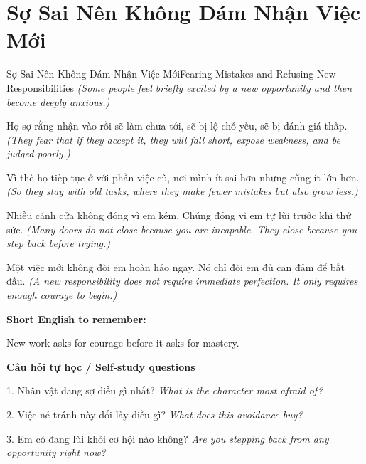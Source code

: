 \section{Sợ Sai Nên Không Dám Nhận Việc Mới}
\begin{truyen}{Sợ Sai Nên Không Dám Nhận Việc Mới}{Fearing Mistakes and Refusing New Responsibilities}
\textit{(Some people feel briefly excited by a new opportunity and then become deeply anxious.)}

Họ sợ rằng nhận vào rồi sẽ làm chưa tới, sẽ bị lộ chỗ yếu, sẽ bị đánh giá thấp.
\textit{(They fear that if they accept it, they will fall short, expose weakness, and be judged poorly.)}

Vì thế họ tiếp tục ở với phần việc cũ, nơi mình ít sai hơn nhưng cũng ít lớn hơn.
\textit{(So they stay with old tasks, where they make fewer mistakes but also grow less.)}

Nhiều cánh cửa không đóng vì em kém. Chúng đóng vì em tự lùi trước khi thử sức.
\textit{(Many doors do not close because you are incapable. They close because you step back before trying.)}

\end{truyen}

\begin{baihoc}
Một việc mới không đòi em hoàn hảo ngay. Nó chỉ đòi em đủ can đảm để bắt đầu.
\textit{(A new responsibility does not require immediate perfection. It only requires enough courage to begin.)}
\end{baihoc}

\begin{ghinhoanh}
\textbf{Short English to remember:}

New work asks for courage before it asks for mastery.

\end{ghinhoanh}

\begin{tuhocnhanh}
\textbf{Câu hỏi tự học / Self-study questions}

1. Nhân vật đang sợ điều gì nhất? \textit{What is the character most afraid of?}

2. Việc né tránh này đổi lấy điều gì? \textit{What does this avoidance buy?}

3. Em có đang lùi khỏi cơ hội nào không? \textit{Are you stepping back from any opportunity right now?}
\end{tuhocnhanh}
\ngancach

